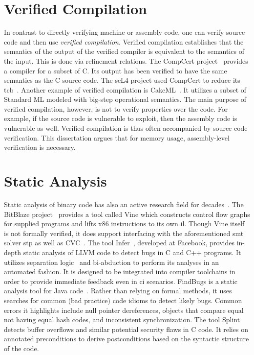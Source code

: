 \section{Verified Compilation}\label{se:verified}
In contrast to directly verifying machine or assembly code,
one can verify source code and then use \emph{verified compilation}.%
Verified compilation establishes that the semantics of the output of the verified compiler
is equivalent to the semantics of the input. This is done via refinement relations.
The CompCert project~\citep{leroy:compcert} provides a compiler for a subset of C.
Its output has been verified to have the same semantics as the C source code.
The seL4 project used CompCert to reduce its \ac{tcb}~\citep{Klein_AEMSKH_14}.
Another example of verified compilation is CakeML~\citep{kumar2014cakeml}.
It utilizes a subset of Standard ML modeled with big-step operational semantics.
The main purpose of verified compilation, however,
is not to verify properties over the code.
For example, if the source code is vulnerable to  exploit,
then the assembly code is vulnerable as well.
Verified compilation is thus often accompanied by source code verification.
This dissertation argues that for memory usage, assembly-level verification is necessary.

\section{Static Analysis}\label{se:static_analysis}
Static analysis of binary code has also an active research field
for decades~\cite{kruegel2005automating,brumley2011bap,wang2017angr}.
The BitBlaze project~\citep{song2008bitblaze}
provides a tool called Vine which constructs control flow graphs
for supplied programs and lifts x86 instructions to its own \ac{il}.
Though Vine itself is not formally verified,
it does support interfacing with the aforementioned \ac{smt} solver \ac{stp}
as well as CVC~\citep{barrett2004cvcl,barrett2007cvc3}.
The tool Infer~\citep{calcagno2011infer}, developed at Facebook,
provides in-depth static analysis of LLVM code to detect bugs in C and C++ programs.
It utilizes separation logic~\citep{reynolds2002separation}
and bi-abduction to perform its analyses in an automated fashion.
It is designed to be integrated into compiler toolchains
in order to provide immediate feedback even in \ac{ci} scenarios.
FindBugs is a static analysis tool for Java code~\citep{hovemeyer2004findbugs}.
Rather than relying on formal methods,
it uses searches for common (bad practice) code idioms to detect likely bugs.
Common errors it highlights include null pointer dereferences,
objects that compare equal not having equal hash codes,
and inconsistent synchronization.
The tool Splint~\citep{evans2002static} detects buffer overflows
and similar potential security flaws in C code.
It relies on annotated preconditions to derive postconditions
based on the syntactic structure of the code.

